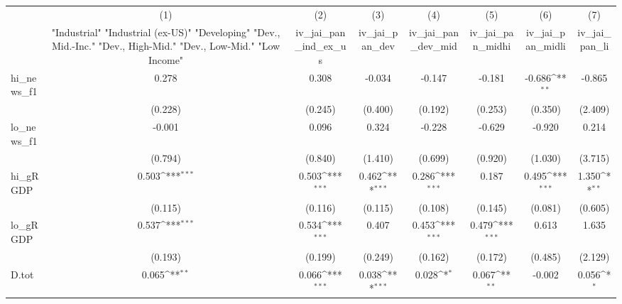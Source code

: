 {
\def\sym#1{\ifmmode^{#1}\else\(^{#1}\)\fi}
\begin{tabular}{l*{7}{c}}
\toprule
            &\multicolumn{1}{c}{(1)}&\multicolumn{1}{c}{(2)}&\multicolumn{1}{c}{(3)}&\multicolumn{1}{c}{(4)}&\multicolumn{1}{c}{(5)}&\multicolumn{1}{c}{(6)}&\multicolumn{1}{c}{(7)}\\
            &\multicolumn{1}{c}{ "Industrial" "Industrial (ex-US)" "Developing" "Dev., Mid.-Inc." "Dev., High-Mid."  "Dev., Low-Mid." "Low Income" }&\multicolumn{1}{c}{iv\_jai\_pan\_ind\_ex\_us}&\multicolumn{1}{c}{iv\_jai\_pan\_dev}&\multicolumn{1}{c}{iv\_jai\_pan\_dev\_mid}&\multicolumn{1}{c}{iv\_jai\_pan\_midhi}&\multicolumn{1}{c}{iv\_jai\_pan\_midli}&\multicolumn{1}{c}{iv\_jai\_pan\_li}\\
\midrule
hi\_news\_f1  &       0.278         &       0.308         &      -0.034         &      -0.147         &      -0.181         &      -0.686\sym{**} &      -0.865         \\
            &     (0.228)         &     (0.245)         &     (0.400)         &     (0.192)         &     (0.253)         &     (0.350)         &     (2.409)         \\
\addlinespace
lo\_news\_f1  &      -0.001         &       0.096         &       0.324         &      -0.228         &      -0.629         &      -0.920         &       0.214         \\
            &     (0.794)         &     (0.840)         &     (1.410)         &     (0.699)         &     (0.920)         &     (1.030)         &     (3.715)         \\
\addlinespace
hi\_gRGDP    &       0.503\sym{***}&       0.503\sym{***}&       0.462\sym{***}&       0.286\sym{***}&       0.187         &       0.495\sym{***}&       1.350\sym{**} \\
            &     (0.115)         &     (0.116)         &     (0.115)         &     (0.108)         &     (0.145)         &     (0.081)         &     (0.605)         \\
\addlinespace
lo\_gRGDP    &       0.537\sym{***}&       0.534\sym{***}&       0.407         &       0.453\sym{***}&       0.479\sym{***}&       0.613         &       1.635         \\
            &     (0.193)         &     (0.199)         &     (0.249)         &     (0.162)         &     (0.172)         &     (0.485)         &     (2.129)         \\
\addlinespace
D.tot       &       0.065\sym{**} &       0.066\sym{***}&       0.038\sym{***}&       0.028\sym{*}  &       0.067\sym{**} &      -0.002         &       0.056\sym{*}  \\

\end{tabular}}
